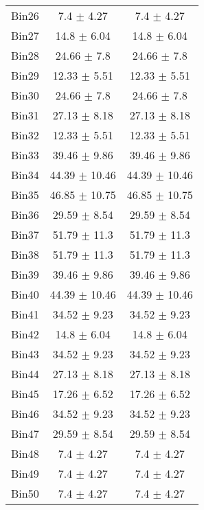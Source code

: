 \begin{tabular}{|c|c|c|}
     Bin26 & 7.4 $\pm$ 4.27 & 7.4 $\pm$ 4.27 \\ \cline{1-3} 
     Bin27 & 14.8 $\pm$ 6.04 & 14.8 $\pm$ 6.04 \\ \cline{1-3} 
     Bin28 & 24.66 $\pm$ 7.8 & 24.66 $\pm$ 7.8 \\ \cline{1-3} 
     Bin29 & 12.33 $\pm$ 5.51 & 12.33 $\pm$ 5.51 \\ \cline{1-3} 
     Bin30 & 24.66 $\pm$ 7.8 & 24.66 $\pm$ 7.8 \\ \cline{1-3} 
     Bin31 & 27.13 $\pm$ 8.18 & 27.13 $\pm$ 8.18 \\ \cline{1-3} 
     Bin32 & 12.33 $\pm$ 5.51 & 12.33 $\pm$ 5.51 \\ \cline{1-3} 
     Bin33 & 39.46 $\pm$ 9.86 & 39.46 $\pm$ 9.86 \\ \cline{1-3} 
     Bin34 & 44.39 $\pm$ 10.46 & 44.39 $\pm$ 10.46 \\ \cline{1-3} 
     Bin35 & 46.85 $\pm$ 10.75 & 46.85 $\pm$ 10.75 \\ \cline{1-3} 
     Bin36 & 29.59 $\pm$ 8.54 & 29.59 $\pm$ 8.54 \\ \cline{1-3} 
     Bin37 & 51.79 $\pm$ 11.3 & 51.79 $\pm$ 11.3 \\ \cline{1-3} 
     Bin38 & 51.79 $\pm$ 11.3 & 51.79 $\pm$ 11.3 \\ \cline{1-3} 
     Bin39 & 39.46 $\pm$ 9.86 & 39.46 $\pm$ 9.86 \\ \cline{1-3} 
     Bin40 & 44.39 $\pm$ 10.46 & 44.39 $\pm$ 10.46 \\ \cline{1-3} 
     Bin41 & 34.52 $\pm$ 9.23 & 34.52 $\pm$ 9.23 \\ \cline{1-3} 
     Bin42 & 14.8 $\pm$ 6.04 & 14.8 $\pm$ 6.04 \\ \cline{1-3} 
     Bin43 & 34.52 $\pm$ 9.23 & 34.52 $\pm$ 9.23 \\ \cline{1-3} 
     Bin44 & 27.13 $\pm$ 8.18 & 27.13 $\pm$ 8.18 \\ \cline{1-3} 
     Bin45 & 17.26 $\pm$ 6.52 & 17.26 $\pm$ 6.52 \\ \cline{1-3} 
     Bin46 & 34.52 $\pm$ 9.23 & 34.52 $\pm$ 9.23 \\ \cline{1-3} 
     Bin47 & 29.59 $\pm$ 8.54 & 29.59 $\pm$ 8.54 \\ \cline{1-3} 
     Bin48 & 7.4 $\pm$ 4.27 & 7.4 $\pm$ 4.27 \\ \cline{1-3} 
     Bin49 & 7.4 $\pm$ 4.27 & 7.4 $\pm$ 4.27 \\ \cline{1-3} 
     Bin50 & 7.4 $\pm$ 4.27 & 7.4 $\pm$ 4.27 \\ \cline{1-3} 

\end{tabular}
